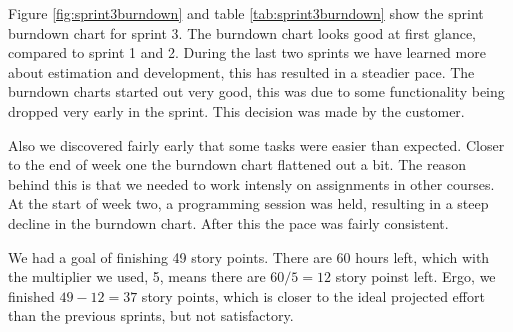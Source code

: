 Figure \ref{fig:sprint3burndown} and table \ref{tab:sprint3burndown} show the sprint 
burndown chart for sprint 3. The burndown chart looks good at first glance, compared to sprint 1 and 2. During the last two sprints we have learned more about estimation and development, this has resulted in a steadier pace. The burndown charts started out very good, this was due to some functionality being dropped very early in the sprint. This decision was made by 
the customer.

Also we discovered fairly early that some tasks were easier than expected. Closer to the end 
of week one the burndown chart flattened out a bit. The reason behind this is that we 
needed to work intensly on assignments in other courses. At the start of week two, a programming 
session was held, resulting in a steep decline in the burndown chart. After this the pace was 
fairly consistent.

We had a goal of finishing 49 story points. There are 60 hours left, which with the 
multiplier we used, 5, means there are $60/5=12$ story poinst left. Ergo, we finished
$49-12=37$ story points, which is closer to the ideal projected effort than the previous sprints, 
but not satisfactory.
\clearpage{}
\blankpage{}